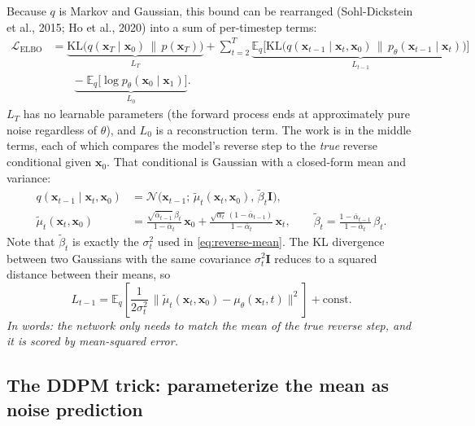 \documentclass[11pt]{article}
\newcommand{\E}{\mathbb{E}}
\newcommand{\KL}{\mathrm{KL}}
\theoremstyle{remark}
\begin{document}
Because $q$ is Markov and Gaussian, this bound can be rearranged (Sohl-Dickstein et al., 2015; Ho et al., 2020) into a sum of per-timestep terms:
\begin{equation}
\begin{aligned}
\mathcal{L}_{\text{ELBO}}
&= \underbrace{\KL\big(q(\mathbf{x}_T\mid\mathbf{x}_0)\,\|\,p(\mathbf{x}_T)\big)}_{L_T}
+ \sum_{t=2}^{T} \underbrace{\E_q\Big[\KL\big(q(\mathbf{x}_{t-1}\mid\mathbf{x}_t,\mathbf{x}_0)\,\|\,p_\theta(\mathbf{x}_{t-1}\mid\mathbf{x}_t)\big)\Big]}_{L_{t-1}} \\
&\qquad \underbrace{-\;\E_q\big[\log p_\theta(\mathbf{x}_0\mid\mathbf{x}_1)\big]}_{L_0}.
\end{aligned}
\label{eq:elbo-decomp}
\end{equation}
$L_T$ has no learnable parameters (the forward process ends at approximately pure noise regardless of $\theta$), and $L_0$ is a reconstruction term. The work is in the middle terms, each of which compares the model's reverse step to the \emph{true} reverse conditional given $\mathbf{x}_0$. That conditional is Gaussian with a closed-form mean and variance:
\begin{equation}
\begin{aligned}
q(\mathbf{x}_{t-1}\mid\mathbf{x}_t,\mathbf{x}_0) &= \mathcal{N}\big(\mathbf{x}_{t-1};\,\tilde{\mu}_t(\mathbf{x}_t,\mathbf{x}_0),\,\tilde{\beta}_t\mathbf{I}\big), \\
\tilde{\mu}_t(\mathbf{x}_t,\mathbf{x}_0) &= \frac{\sqrt{\bar{\alpha}_{t-1}}\,\beta_t}{1-\bar{\alpha}_t}\,\mathbf{x}_0 + \frac{\sqrt{\alpha_t}\,(1-\bar{\alpha}_{t-1})}{1-\bar{\alpha}_t}\,\mathbf{x}_t,
\qquad
\tilde{\beta}_t = \frac{1-\bar{\alpha}_{t-1}}{1-\bar{\alpha}_t}\,\beta_t.
\end{aligned}
\label{eq:posterior}
\end{equation}
Note that $\tilde{\beta}_t$ is exactly the $\sigma_t^2$ used in \eqref{eq:reverse-mean}. The KL divergence between two Gaussians with the same covariance $\sigma_t^2\mathbf{I}$ reduces to a squared distance between their means, so
\begin{equation}
L_{t-1} = \E_q\!\left[\frac{1}{2\sigma_t^2}\,\big\|\tilde{\mu}_t(\mathbf{x}_t,\mathbf{x}_0) - \mu_\theta(\mathbf{x}_t,t)\big\|^2\right] + \text{const}.
\label{eq:kl-mean}
\end{equation}
\textit{In words: the network only needs to match the mean of the true reverse step, and it is scored by mean-squared error.}

\subsection{The DDPM trick: parameterize the mean as noise prediction}
\end{document}

